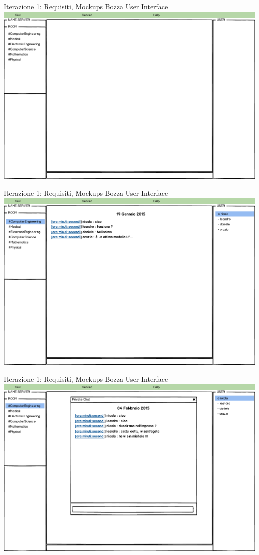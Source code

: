 \documentclass[t]{beamer} %
\begin{document}
\begin{frame} {Iterazione 1: Requisiti, Mockups Bozza User Interface}
    \includegraphics[scale=0.29]{image_mockups/06_snuc_connect.png}{\centering}
\end{frame}

\begin{frame} {Iterazione 1: Requisiti, Mockups Bozza User Interface}
    \includegraphics[scale=0.29]{image_mockups/07_snuc_user_room_ce.png}{\centering}
\end{frame}

\begin{frame} {Iterazione 1: Requisiti, Mockups Bozza User Interface}
    \includegraphics[scale=0.29]{image_mockups/08_snuc_user_room_ce_private.png}{\centering}
\end{frame}
\end{document}
